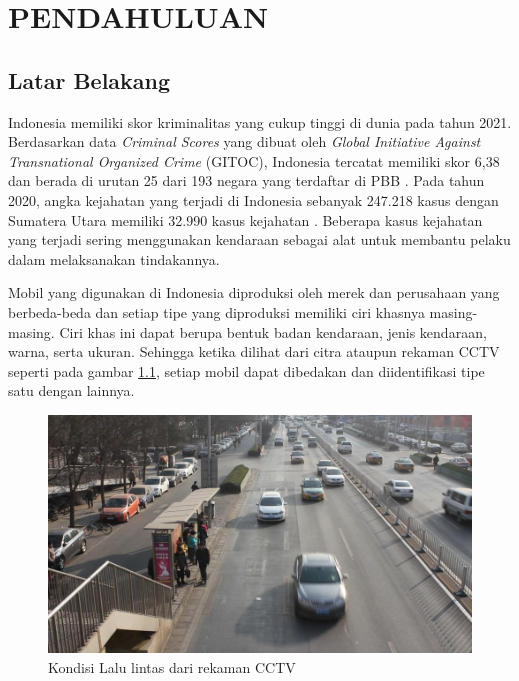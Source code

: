 \chapter{PENDAHULUAN}
\label{chap:pendahuluan}

\section{Latar Belakang}
\label{sec:latarbelakang}

Indonesia memiliki skor kriminalitas yang cukup tinggi di dunia pada tahun 2021. \linebreak
Berdasarkan data \emph{Criminal Scores} yang dibuat oleh \emph{Global Initiative Against Transnational Organized Crime} 
(GITOC), Indonesia tercatat memiliki skor 6,38 dan berada di urutan 25 dari 193 negara yang 
terdaftar di PBB \parencite{Gitoc2021}. Pada tahun 2020, angka kejahatan yang terjadi di Indonesia 
sebanyak 247.218 kasus dengan Sumatera Utara memiliki 32.990 kasus kejahatan \parencite{Bpskriminal2021}.
Beberapa kasus kejahatan yang terjadi sering menggunakan kendaraan sebagai alat untuk membantu pelaku 
dalam melaksanakan tindakannya.

Mobil yang digunakan di Indonesia diproduksi oleh merek dan perusahaan yang berbeda-beda 
dan setiap tipe yang diproduksi memiliki ciri khasnya masing-masing. Ciri khas ini dapat 
berupa bentuk badan kendaraan, jenis kendaraan, warna, serta ukuran. Sehingga ketika dilihat 
dari citra ataupun rekaman CCTV seperti pada gambar \ref{fig:RekamanCCTV}, setiap mobil dapat 
dibedakan dan diidentifikasi tipe satu dengan lainnya.


\begin{figure}[ht]
      \centering
      \includegraphics[scale=0.3]{gambar/Mobil.jpg}
      \caption{Kondisi Lalu lintas dari rekaman CCTV}
      \label{fig:RekamanCCTV}
\end{figure}

